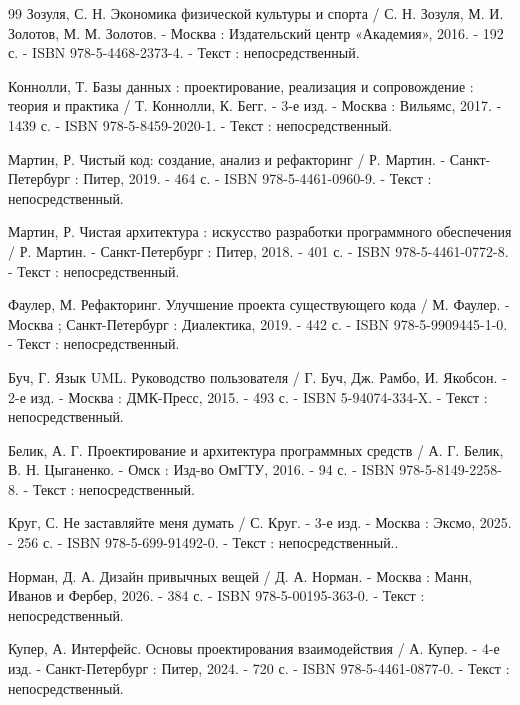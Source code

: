 \begin{thebibliography}{99}
	 Зозуля, С. Н. Экономика физической культуры и спорта / С. Н. Зозуля, М. И. Золотов, М. М. Золотов. - Москва : Издательский центр «Академия», 2016. - 192 с. - ISBN 978-5-4468-2373-4. - Текст : непосредственный.
	
	
	 Коннолли, Т. Базы данных : проектирование, реализация и сопровождение : теория и практика / Т. Коннолли, К. Бегг. - 3-е изд. - Москва : Вильямс, 2017. - 1439 с. - ISBN 978-5-8459-2020-1. - Текст : непосредственный.
	
	
	
	
	
	 Мартин, Р. Чистый код: создание, анализ и рефакторинг / Р. Мартин. - Санкт-Петербург : Питер, 2019. - 464 с. - ISBN 978-5-4461-0960-9. - Текст : непосредственный.
	
	 Мартин, Р. Чистая архитектура : искусство разработки программного обеспечения / Р. Мартин. - Санкт-Петербург : Питер, 2018. - 401 с. - ISBN 978-5-4461-0772-8. - Текст : непосредственный.
	
	 Фаулер, М. Рефакторинг. Улучшение проекта существующего кода / М. Фаулер. - Москва ; Санкт-Петербург : Диалектика, 2019. - 442 с. - ISBN 978-5-9909445-1-0. - Текст : непосредственный.
	
	 Буч, Г. Язык UML. Руководство пользователя / Г. Буч, Дж. Рамбо, И. Якобсон. - 2-е изд. - Москва : ДМК-Пресс, 2015. - 493 с. - ISBN 5-94074-334-X. - Текст : непосредственный.
	
	 Белик, А. Г. Проектирование и архитектура программных средств / А. Г. Белик, В. Н. Цыганенко. - Омск : Изд-во ОмГТУ, 2016. - 94 с. - ISBN 978-5-8149-2258-8. - Текст : непосредственный.
	
	
	
	
	 Круг, С. Не заставляйте меня думать / С. Круг. - 3-е изд. - Москва : Эксмо, 2025. - 256 с. - ISBN 978-5-699-91492-0. - Текст : непосредственный..
	
	 Норман, Д. А. Дизайн привычных вещей / Д. А. Норман. - Москва : Манн, Иванов и Фербер, 2026. - 384 с. - ISBN 978-5-00195-363-0. - Текст : непосредственный.
	
	 Купер, А. Интерфейс. Основы проектирования взаимодействия / А. Купер. - 4-е изд. - Санкт-Петербург : Питер, 2024. - 720 с. - ISBN 978-5-4461-0877-0. - Текст : непосредственный.
	

\end{thebibliography}
